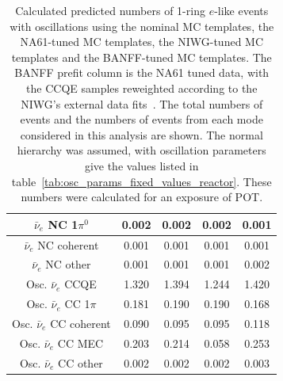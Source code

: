 \begin{table}
\begin{tabular} { | c ||c | c | c | c |  | }
$\bar{\nu}_e$ NC 1$\pi^0$                         & 0.002               & 0.002               & 0.002               & 0.001                \\ \hline 
$\bar{\nu}_e$ NC coherent                         & 0.001               & 0.001               & 0.001               & 0.001                \\ \hline 
$\bar{\nu}_e$ NC other                            & 0.001               & 0.001               & 0.001               & 0.002                \\ \hline 
Osc. $\bar{\nu}_e$ CCQE                           & 1.320               & 1.394               & 1.244               & 1.420                \\ \hline 
Osc. $\bar{\nu}_e$ CC 1$\pi$                      & 0.181               & 0.190               & 0.190               & 0.168                \\ \hline 
Osc. $\bar{\nu}_e$ CC coherent                    & 0.090               & 0.095               & 0.095               & 0.118                \\ \hline 
Osc. $\bar{\nu}_e$ CC MEC                         & 0.203               & 0.214               & 0.058               & 0.253                \\ \hline 
Osc. $\bar{\nu}_e$ CC other                       & 0.002               & 0.002               & 0.002               & 0.003                \\ \hline 

\end{tabular}
\caption{
  Calculated predicted numbers of 1-ring $e$-like events with oscillations using the nominal MC templates, the
  NA61-tuned MC templates, the NIWG-tuned MC templates and the BANFF-tuned MC templates.
  The BANFF prefit column is the NA61 tuned data, with the CCQE samples reweighted according to the NIWG's external data fits~\cite{NIWGCCQE}.
  The total numbers of events and the numbers of events from each mode considered in this analysis are shown.
  The normal hierarchy was assumed, with oscillation parameters give the values listed in table~\ref{tab:osc_params_fixed_values_reactor}.
  These numbers were calculated for an exposure of \TotalPot POT.
}
\label{tab:nsk_nominal_osc}
\end{table}
